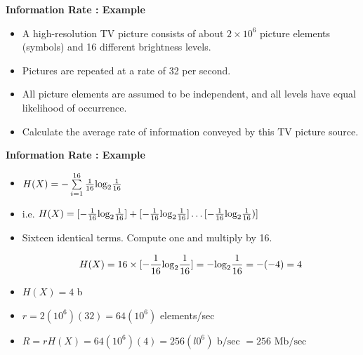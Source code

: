 \documentclass[]{article}
\begin{document}

\noindent \textbf{Information Rate : Example}
\begin{itemize}

\item A high-resolution TV picture consists of about $2 \times 10^6$ picture elements (symbols) and 16
different brightness levels. \item Pictures are repeated at a rate of 32 per second. \item All picture elements
are assumed to be independent, and all levels have equal likelihood of occurrence. \item Calculate the
average rate of information conveyed by this TV picture source.

\end{itemize}



\noindent \textbf{Information Rate : Example}
\begin{itemize}
\item $H(X) = - \sum \limits^{16}_{i=1} {1\over16} \mbox{log}_2{1\over16}$ \bigskip

\item i.e. $H(X) = [ -{1\over16} \mbox{log}_2{1\over16} ] + [- {1\over16} \mbox{log}_2{1\over16} ] \ldots [ -{1\over16} \mbox{log}_2{1\over16}) ] $ \bigskip
\item Sixteen identical terms. Compute one and multiply by 16.

\[ H(X) = 16 \times [ -{1\over16} \mbox{log}_2{1\over16} ]  = -\mbox{log}_2{1\over16} = -(-4) = 4\] \bigskip
\item $H(X)= 4$ b
\item $r =  2(10^6)(32) = 64(10^6)$ elements/sec \bigskip

\item $R = rH(X) = 64(10^6)(4) = 256(l0^6) \mbox{ b/sec } = 256 \mbox{ Mb/sec }$ \bigskip
\end{itemize}
\end{document}
